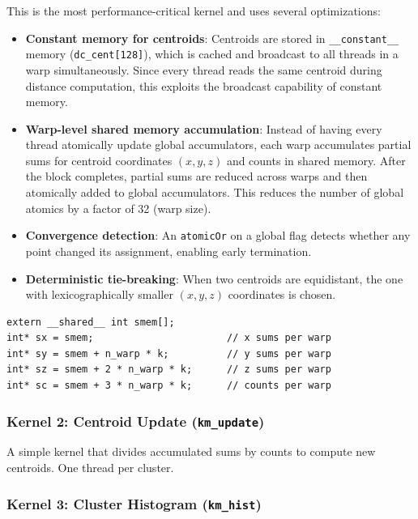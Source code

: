 \documentclass[11pt,a4paper]{article}
\begin{document}
This is the most performance-critical kernel and uses several optimizations:

\begin{itemize}
    \item \textbf{Constant memory for centroids}: Centroids are stored in \texttt{\_\_constant\_\_} memory (\texttt{dc\_cent[128]}), which is cached and broadcast to all threads in a warp simultaneously. Since every thread reads the same centroid during distance computation, this exploits the broadcast capability of constant memory.

    \item \textbf{Warp-level shared memory accumulation}: Instead of having every thread atomically update global accumulators, each warp accumulates partial sums for centroid coordinates $(x, y, z)$ and counts in shared memory. After the block completes, partial sums are reduced across warps and then atomically added to global accumulators. This reduces the number of global atomics by a factor of 32 (warp size).

    \item \textbf{Convergence detection}: An \texttt{atomicOr} on a global flag detects whether any point changed its assignment, enabling early termination.

    \item \textbf{Deterministic tie-breaking}: When two centroids are equidistant, the one with lexicographically smaller $(x, y, z)$ coordinates is chosen.
\end{itemize}

\begin{lstlisting}[caption={Shared memory layout for warp-level accumulation}]
extern __shared__ int smem[];
int* sx = smem;                       // x sums per warp
int* sy = smem + n_warp * k;          // y sums per warp
int* sz = smem + 2 * n_warp * k;      // z sums per warp
int* sc = smem + 3 * n_warp * k;      // counts per warp
\end{lstlisting}

\subsubsection{Kernel 2: Centroid Update (\texttt{km\_update})}

A simple kernel that divides accumulated sums by counts to compute new centroids. One thread per cluster.

\subsubsection{Kernel 3: Cluster Histogram (\texttt{km\_hist})}
\end{document}
